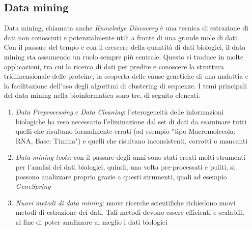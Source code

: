 \subsection{Data mining}
Data mining, chiamata anche \textit{Knowledge Discovery} è una tecnica di estrazione di dati non conosciuti e potenzialmente utili a fronte di una grande mole di dati. Con il passare del tempo e con il crescere della quantità di dati biologici, il data mining sta assumendo un ruolo sempre più centrale. Questo si traduce in molte applicazioni, tra cui la ricerca di dati per predire e conoscere la struttura tridimensionale delle proteine, la scoperta delle cause genetiche di una malattia e la facilitazione dell'uso degli algoritmi di clustering di sequenze.
\newline
I temi principali del data mining nella bioinformatica sono tre, di seguito elencati.
\begin{enumerate}
	\item \textit{Data Preprocessing} e \textit{Data Cleaning}: l'eterogeneità delle informazioni biologiche ha reso necessario l'eliminazione dal set di dati da esaminare tutti quelli che risultano formalmente errati (ad esempio "tipo Macromolecola: RNA, Base: Timina") e quelli che risultano inconsistenti, corrotti o mancanti
	\item \textit{Data mining tools}: con il passare degli anni sono stati creati molti strumenti per l'analisi dei dati biologici, quindi, una volta pre-processati e puliti, si possono analizzare proprio grazie a questi strumenti, quali ad esempio \textit{GeneSpring}
	\item \textit{Nuovi metodi di data mining}: nuove ricerche scientifiche richiedono nuovi metodi di estrazione dei dati. Tali metodi devono essere efficienti e scalabili, al fine di poter analizzare al meglio i dati biologici
\end{enumerate}

